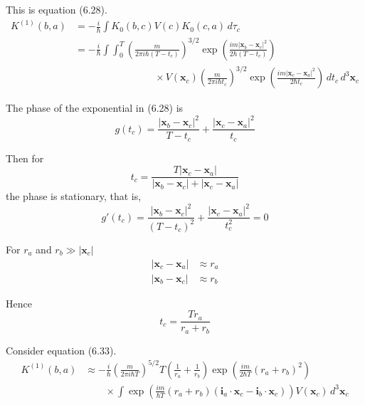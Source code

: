


\bigskip
This is equation (6.28).
\begin{align*}
K^{(1)}(b,a)&=-\frac{i}{\hbar}\int K_0(b,c)V(c)K_0(c,a)\,d\tau_c
\\
&=-\frac{i}{\hbar}\int\int_0^T
\left(\frac{m}{2\pi i\hbar(T-t_c)}\right)^{3/2}
\exp\left(\frac{im|\mathbf x_b-\mathbf x_c|^2}{2\hbar(T-t_c)}\right)
\\
&\qquad\qquad\qquad\qquad{}\times V(\mathbf x_c)
\left(\frac{m}{2\pi i\hbar t_c}\right)^{3/2}
\exp\left(\frac{im|\mathbf x_c-\mathbf x_a|^2}{2\hbar t_c}\right)
\,dt_c\,d^3\mathbf x_c
\tag{6.28}
\end{align*}

The phase of the exponential in (6.28) is
\begin{equation*}
g(t_c)=
\frac{|\mathbf x_b-\mathbf x_c|^2}{T-t_c}
+
\frac{|\mathbf x_c-\mathbf x_a|^2}{t_c}
\end{equation*}

Then for
\begin{equation*}
t_c=\frac{T|\mathbf x_c-\mathbf x_a|}{|\mathbf x_b-\mathbf x_c|+|\mathbf x_c-\mathbf x_a|}
\end{equation*}
the phase is stationary, that is,
\begin{equation*}
g'(t_c)=
\frac{|\mathbf x_b-\mathbf x_c|^2}{(T-t_c)^2}
+
\frac{|\mathbf x_c-\mathbf x_a|^2}{t_c^2}
=0
\end{equation*}

For $r_a$ and $r_b\gg|\mathbf x_c|$
\begin{align*}
|\mathbf x_c-\mathbf x_a|&\approx r_a %
\\
|\mathbf x_b-\mathbf x_c|&\approx r_b %
\end{align*}

Hence
\begin{equation*}
t_c=\frac{Tr_a}{r_a+r_b}
\end{equation*}



Consider equation (6.33).
\begin{align*}
K^{(1)}(b,a)&\approx
-\frac{i}{\hbar}
\left(\frac{m}{2\pi i\hbar T}\right)^{5/2}
T
\left(\frac{1}{r_a}+\frac{1}{r_b}\right)
\exp\left(\frac{im}{2\hbar T}(r_a+r_b)^2\right)
\\
&\qquad{}\times\int
\exp\left(\frac{im}{\hbar T}(r_a+r_b)(\mathbf i_a\cdot\mathbf x_c-\mathbf i_b\cdot\mathbf x_c)\right)
V(\mathbf x_c)
\,d^3\mathbf x_c
\end{align*}


